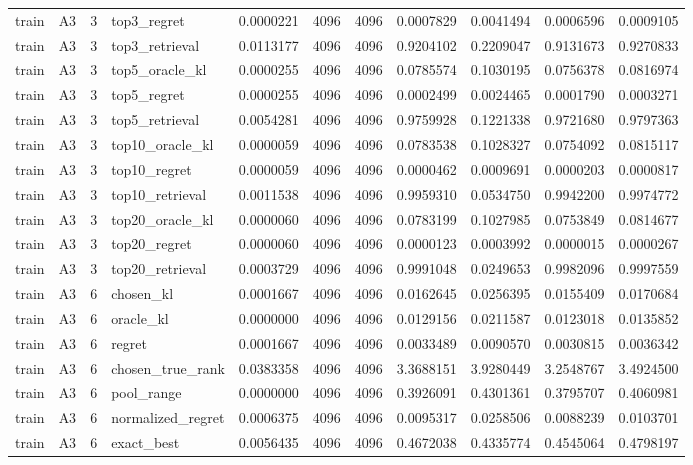 \begin{tabular}{llrlrrrrrrr}
train & A3 & 3 & top3_regret & 0.0000221 & 4096 & 4096 & 0.0007829 & 0.0041494 & 0.0006596 & 0.0009105 \\
train & A3 & 3 & top3_retrieval & 0.0113177 & 4096 & 4096 & 0.9204102 & 0.2209047 & 0.9131673 & 0.9270833 \\
train & A3 & 3 & top5_oracle_kl & 0.0000255 & 4096 & 4096 & 0.0785574 & 0.1030195 & 0.0756378 & 0.0816974 \\
train & A3 & 3 & top5_regret & 0.0000255 & 4096 & 4096 & 0.0002499 & 0.0024465 & 0.0001790 & 0.0003271 \\
train & A3 & 3 & top5_retrieval & 0.0054281 & 4096 & 4096 & 0.9759928 & 0.1221338 & 0.9721680 & 0.9797363 \\
train & A3 & 3 & top10_oracle_kl & 0.0000059 & 4096 & 4096 & 0.0783538 & 0.1028327 & 0.0754092 & 0.0815117 \\
train & A3 & 3 & top10_regret & 0.0000059 & 4096 & 4096 & 0.0000462 & 0.0009691 & 0.0000203 & 0.0000817 \\
train & A3 & 3 & top10_retrieval & 0.0011538 & 4096 & 4096 & 0.9959310 & 0.0534750 & 0.9942200 & 0.9974772 \\
train & A3 & 3 & top20_oracle_kl & 0.0000060 & 4096 & 4096 & 0.0783199 & 0.1027985 & 0.0753849 & 0.0814677 \\
train & A3 & 3 & top20_regret & 0.0000060 & 4096 & 4096 & 0.0000123 & 0.0003992 & 0.0000015 & 0.0000267 \\
train & A3 & 3 & top20_retrieval & 0.0003729 & 4096 & 4096 & 0.9991048 & 0.0249653 & 0.9982096 & 0.9997559 \\
train & A3 & 6 & chosen_kl & 0.0001667 & 4096 & 4096 & 0.0162645 & 0.0256395 & 0.0155409 & 0.0170684 \\
train & A3 & 6 & oracle_kl & 0.0000000 & 4096 & 4096 & 0.0129156 & 0.0211587 & 0.0123018 & 0.0135852 \\
train & A3 & 6 & regret & 0.0001667 & 4096 & 4096 & 0.0033489 & 0.0090570 & 0.0030815 & 0.0036342 \\
train & A3 & 6 & chosen_true_rank & 0.0383358 & 4096 & 4096 & 3.3688151 & 3.9280449 & 3.2548767 & 3.4924500 \\
train & A3 & 6 & pool_range & 0.0000000 & 4096 & 4096 & 0.3926091 & 0.4301361 & 0.3795707 & 0.4060981 \\
train & A3 & 6 & normalized_regret & 0.0006375 & 4096 & 4096 & 0.0095317 & 0.0258506 & 0.0088239 & 0.0103701 \\
train & A3 & 6 & exact_best & 0.0056435 & 4096 & 4096 & 0.4672038 & 0.4335774 & 0.4545064 & 0.4798197 \\

\end{tabular}
